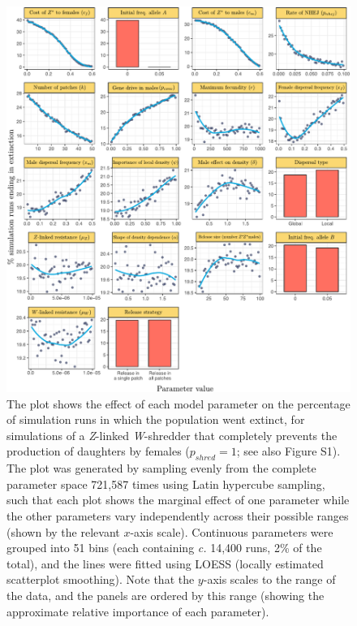 \documentclass[]{rsos}%
\begin{document}
\begin{figure}[h]
\includegraphics[width=1.0\textwidth]{../figures/fig_3_inkscape.pdf}
\caption{\footnotesize{The plot shows the effect of each model parameter on the percentage of simulation runs in which the population went extinct, for simulations of a \textit{Z}-linked \textit{W}-shredder that completely prevents the production of daughters by females ($p_{shred} = 1$; see also Figure S1). The plot was generated by sampling evenly from the complete parameter space 721,587 times using Latin hypercube sampling, such that each plot shows the marginal effect of one parameter while the other parameters vary independently across their possible ranges (shown by the relevant $x$-axis scale). Continuous parameters were grouped into 51 bins (each containing \textit{c.} 14,400 runs, 2\% of the total), and the lines were fitted using LOESS (locally estimated scatterplot smoothing). Note that the $y$-axis scales to the range of the data, and the panels are ordered by this range (showing the approximate relative importance of each parameter).}}
\end{figure}
\newpage
\end{document}
